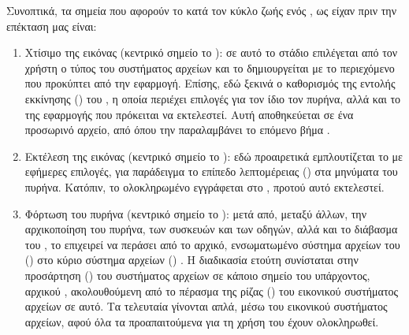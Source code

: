 Συνοπτικά, τα σημεία που αφορούν το  κατά τον κύκλο ζωής
ενός \osv{} , ως είχαν πριν την επέκταση μας είναι:
\begin{enumerate}
    \item Χτίσιμο της εικόνας (κεντρικό σημείο το ): σε αυτό
          το στάδιο επιλέγεται από τον χρήστη ο τύπος του συστήματος αρχείων
          και το  δημιουργείται με το περιεχόμενο που
          προκύπτει από την εφαρμογή. Επίσης, εδώ ξεκινά ο καθορισμός της
          εντολής εκκίνησης () του , η οποία
          περιέχει επιλογές για τον ίδιο τον πυρήνα, αλλά και το  της εφαρμογής που πρόκειται να εκτελεστεί. Αυτή αποθηκεύεται
          σε ένα προσωρινό αρχείο, από όπου την παραλαμβάνει το επόμενο βήμα
          \cite{osv-wiki:osv-components}.
    \item Εκτέλεση της εικόνας (κεντρικό σημείο το ): εδώ
          προαιρετικά εμπλουτίζεται το  με εφήμερες επιλογές,
          για παράδειγμα το επίπεδο λεπτομέρειας () στα μηνύματα
          του πυρήνα. Κατόπιν, το ολοκληρωμένο  εγγράφεται στο
          , προτού αυτό εκτελεστεί.
    \item Φόρτωση του πυρήνα (κεντρικό σημείο το ): μετά από,
          μεταξύ άλλων, την αρχικοποίηση του πυρήνα, των συσκευών και των
          οδηγών, αλλά και το διάβασμα του , το \osv{}
          επιχειρεί να περάσει από το αρχικό, ενσωματωμένο σύστημα αρχείων του
          () στο κύριο σύστημα αρχείων ()
          \cite{osv-wiki:osv-loader}. Η διαδικασία ετούτη συνίσταται στην
          προσάρτηση () του συστήματος αρχείων σε κάποιο σημείο του
          υπάρχοντος, αρχικού , ακολουθούμενη από το πέρασμα της ρίζας
          () του εικονικού συστήματος αρχείων σε αυτό. Τα τελευταία
          γίνονται απλά, μέσω του εικονικού συστήματος αρχείων, αφού όλα τα
          προαπαιτούμενα για τη χρήση του έχουν ολοκληρωθεί.
\end{enumerate}

